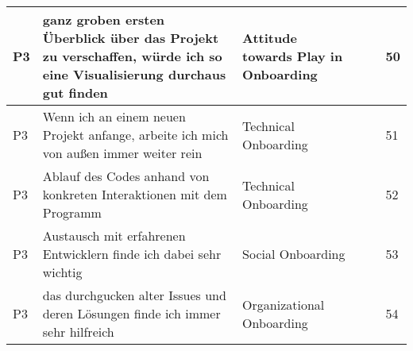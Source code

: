 \begin{appendices}
\begin{landscape}
\begin{longtable}{|p{0.8cm}|p{7cm}|p{3cm}|p{3cm}|p{5.5cm}|p{0.5cm}|}
      P3                   & ganz groben ersten Überblick über das Projekt zu verschaffen, würde ich so eine Visualisierung durchaus gut finden                                                                                                                                                          & Attitude towards Play in Onboarding      &                                    &                                                                                                                                                    & 50           \\ \hline
      P3                   & Wenn ich an einem neuen Projekt anfange, arbeite ich mich von außen immer weiter rein                                                                                                                                                                                       & Technical Onboarding                     &                                    &                                                                                                                                                    & 51           \\ \hline
      P3                   & Ablauf des Codes anhand von konkreten Interaktionen mit dem Programm                                                                                                                                                                                                        & Technical Onboarding                     &                                    &                                                                                                                                                    & 52           \\ \hline
      P3                   & Austausch mit erfahrenen Entwicklern finde ich dabei sehr wichtig                                                                                                                                                                                                           & Social Onboarding                        &                                    &                                                                                                                                                    & 53           \\ \hline
      P3                   & das durchgucken alter Issues und deren Lösungen finde ich immer sehr hilfreich                                                                                                                                                                                              & Organizational Onboarding                &                                    &                                                                                                                                                    & 54           \\ \hline

\end{longtable}
\end{landscape}
\end{appendices}
